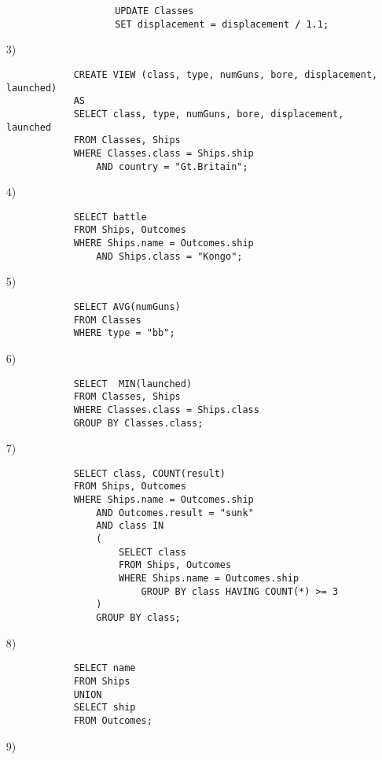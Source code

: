 \documentclass[10pt,a4paper]{article}
\begin{document}
\begin{enumerate}
\begin{itemize}
\begin{verbatim}
                UPDATE Classes
                SET displacement = displacement / 1.1;
            \end{verbatim}  
        \end{itemize}
        \item[3)]\begin{verbatim}
            CREATE VIEW (class, type, numGuns, bore, displacement, launched)
            AS
            SELECT class, type, numGuns, bore, displacement, launched
            FROM Classes, Ships
            WHERE Classes.class = Ships.ship
                AND country = "Gt.Britain";
        \end{verbatim}
        \item[4)]\begin{verbatim}
            SELECT battle
            FROM Ships, Outcomes
            WHERE Ships.name = Outcomes.ship
                AND Ships.class = "Kongo";
        \end{verbatim}
        \item[5)]\begin{verbatim}
            SELECT AVG(numGuns)
            FROM Classes
            WHERE type = "bb";
        \end{verbatim}
        \item[6)]\begin{verbatim}
            SELECT  MIN(launched)
            FROM Classes, Ships
            WHERE Classes.class = Ships.class
            GROUP BY Classes.class;
        \end{verbatim}
        \item[7)]\begin{verbatim}
            SELECT class, COUNT(result)
            FROM Ships, Outcomes
            WHERE Ships.name = Outcomes.ship
                AND Outcomes.result = "sunk"
                AND class IN
                (
                    SELECT class
                    FROM Ships, Outcomes
                    WHERE Ships.name = Outcomes.ship
                        GROUP BY class HAVING COUNT(*) >= 3
                )
                GROUP BY class;
        \end{verbatim}
        \item[8)]\begin{verbatim}
            SELECT name
            FROM Ships
            UNION
            SELECT ship
            FROM Outcomes;
        \end{verbatim}
        \item[9)]\begin{verbatim}

\end{verbatim}
\end{enumerate}
\end{document}

